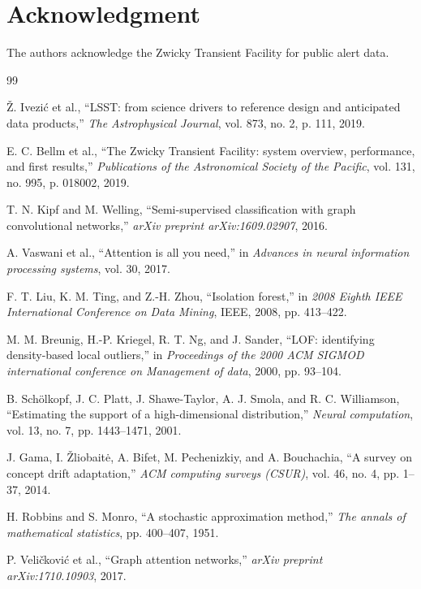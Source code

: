 \documentclass[10pt,journal,compsoc]{IEEEtran}
\begin{document}
\section*{Acknowledgment}
The authors acknowledge the Zwicky Transient Facility for public alert data. 

\begin{thebibliography}{99}

\v{Z}. Ivezi\'{c} et al., ``LSST: from science drivers to reference design and anticipated data products,'' \emph{The Astrophysical Journal}, vol. 873, no. 2, p. 111, 2019.

E. C. Bellm et al., ``The Zwicky Transient Facility: system overview, performance, and first results,'' \emph{Publications of the Astronomical Society of the Pacific}, vol. 131, no. 995, p. 018002, 2019.

T. N. Kipf and M. Welling, ``Semi-supervised classification with graph convolutional networks,'' \emph{arXiv preprint arXiv:1609.02907}, 2016.

A. Vaswani et al., ``Attention is all you need,'' in \emph{Advances in neural information processing systems}, vol. 30, 2017.

F. T. Liu, K. M. Ting, and Z.-H. Zhou, ``Isolation forest,'' in \emph{2008 Eighth IEEE International Conference on Data Mining}, IEEE, 2008, pp. 413--422.

M. M. Breunig, H.-P. Kriegel, R. T. Ng, and J. Sander, ``LOF: identifying density-based local outliers,'' in \emph{Proceedings of the 2000 ACM SIGMOD international conference on Management of data}, 2000, pp. 93--104.

B. Sch\"{o}lkopf, J. C. Platt, J. Shawe-Taylor, A. J. Smola, and R. C. Williamson, ``Estimating the support of a high-dimensional distribution,'' \emph{Neural computation}, vol. 13, no. 7, pp. 1443--1471, 2001.

J. Gama, I. \v{Z}liobait\.{e}, A. Bifet, M. Pechenizkiy, and A. Bouchachia, ``A survey on concept drift adaptation,'' \emph{ACM computing surveys (CSUR)}, vol. 46, no. 4, pp. 1--37, 2014.

H. Robbins and S. Monro, ``A stochastic approximation method,'' \emph{The annals of mathematical statistics}, pp. 400--407, 1951.

P. Veli\v{c}kovi\'{c} et al., ``Graph attention networks,'' \emph{arXiv preprint arXiv:1710.10903}, 2017.


\end{thebibliography}
\end{document}
